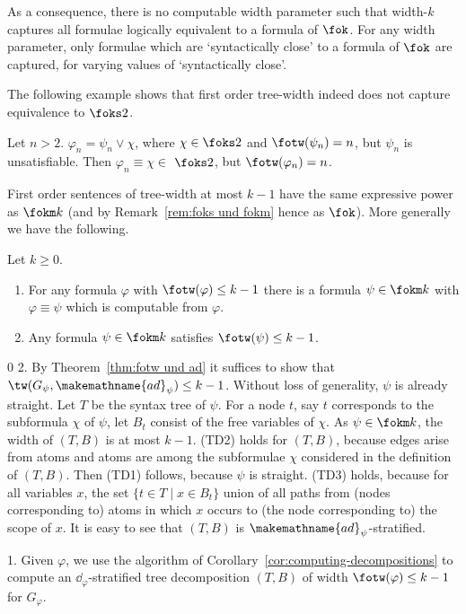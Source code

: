 \documentclass{LMCS}
\newcommand{\gfi}{G_{\varphi}}
\renewcommand{\phi}{\varphi}
\newcommand{\ad}{\dd_{\varphi}}
\newcommand{\alte}{\makemathname{ad}}
\begin{document}
As a consequence, there is no computable width parameter 
such that width-$k$ captures all formulae 
logically equivalent to a formula of $\fok$. 
For any width parameter, only formulae 
which are \lq{}syntactically close\rq{} to a formula of $\fok$ are captured, 
for varying values of \lq{}syntactically close\rq{}. 

The following example shows that first order tree-width indeed does not
capture equivalence to $\foks2$.

\begin{exa}
	Let $n>2$. $\phi_n=\psi_n\vee\chi$, where 
	$\chi\in \foks2$ and
	$\fotw(\psi_n)=n$, but $\psi_n$ is unsatisfiable.  Then
	$\phi_n\equiv\chi\in$ $\foks2$, but $\fotw(\phi_n)=n$.
\end{exa}

First order sentences of tree-width at most $k-1$ have the same expressive
power as $\fokm k$ (and by Remark~\ref{rem:foks und fokm} hence as $\fok$). 
More generally we have the following.

\begin{thm}\label{theo:fotw-fok}
Let $k\ge 0$. 
\begin{enumerate}[\em(1)]
\item For any formula $\phi$ with $\fotw(\phi)\le k-1$ there is a formula
  $\psi\in\fokm k$ with $\phi\equiv\psi$ which is computable from $\phi$. 
\item Any formula $\psi\in\fokm k$ satisfies $\fotw(\psi)\le k-1$.
\end{enumerate}
\end{thm}

\proof
\setcounter{clam}0
2. By Theorem~\ref{thm:fotw und ad} it suffices to show 
  that $\tw(G_{\psi},\alte_{\psi})\leq k-1$. 
  Without loss of generality, $\psi$ is already straight. 
  Let $T$ be the syntax tree of $\psi$. 
  For a node $t$, say $t$ corresponds to the subformula $\chi$ of $\psi$, 
  let $B_t$ consist of the free variables of $\chi$. 
  As $\psi\in\fokm k$, the width of $(T,B)$ is at most $k-1$. 
(TD2) holds for $(T,B)$, because edges arise from atoms and atoms are
among the subformulae $\chi$ considered in the definition of $(T,B)$. 
Then (TD1) follows, because $\psi$ is straight. 
(TD3) holds, because for all variables $x$, 
the set $\{t\in T\mid x\in B_t\}$ union of all paths 
from (nodes corresponding to) atoms in which $x$ occurs 
to (the node corresponding to) the scope of $x$. 
  It is easy to see that $(T,B)$ is $\alte_{\psi}$-stratified. 

1. Given $\phi$, 
we use the algorithm of Corollary~\ref{cor:computing-decompositions} 
to compute an $\ad$-stratified tree decomposition $(T,B)$ 
of width $\fotw(\phi)\le k-1$ for $\gfi$. 
\end{document}
